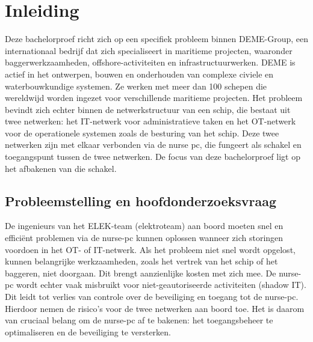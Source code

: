 


% 

\section{Inleiding}%
\label{sec:inleiding}
Deze bachelorproef richt zich op een specifiek probleem binnen DEME-Group, een internationaal bedrijf dat zich specialiseert in maritieme projecten, waaronder baggerwerkzaamheden, offshore-activiteiten en infrastructuurwerken. 
DEME is actief in het ontwerpen, bouwen en onderhouden van complexe civiele en waterbouwkundige systemen. Ze werken met meer dan 100 schepen die wereldwijd worden ingezet voor verschillende maritieme projecten.
Het probleem bevindt zich echter binnen de netwerkstructuur van een schip, die bestaat uit twee netwerken: 
het IT-netwerk voor administratieve taken en het OT-netwerk voor de operationele systemen zoals de besturing van het schip. Deze twee netwerken zijn met elkaar verbonden via de nurse pc, die fungeert 
als schakel en toegangspunt tussen de twee netwerken. De focus van deze bachelorproef ligt op het afbakenen van die schakel.

\subsection{Probleemstelling en hoofdonderzoeksvraag}
De ingenieurs van het ELEK-team (elektroteam) aan boord moeten snel en efficiënt problemen via de nurse-pc kunnen oplossen wanneer zich storingen voordoen in het OT- of IT-netwerk. Als het probleem niet snel wordt opgelost, kunnen belangrijke werkzaamheden, 
zoals het vertrek van het schip of het baggeren, niet doorgaan. Dit brengt aanzienlijke kosten met zich mee.
De nurse-pc wordt echter vaak misbruikt voor niet-geautoriseerde activiteiten (shadow IT). Dit leidt tot verlies van controle over de beveiliging en toegang tot de nurse-pc. 
Hierdoor nemen de risico’s voor de twee netwerken aan boord toe. Het is daarom van cruciaal belang om de nurse-pc af te bakenen: het toegangsbeheer te optimaliseren en de beveiliging te versterken.

